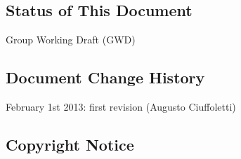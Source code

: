 \documentclass[12pt]{article}  %
\begin{document}
\newcommand{\mixin}[2]{
\begin{tabular}{ll}
\hline
Model attribute & value \\ \hline
scheme & http://ogf.schemas.sla/occi/monitoring\# \\
term & #1 \\
attributes & #2 \\ \hline
\end{tabular}
}

\newcommand{\extramixin}[2]{
\begin{tabular}{ll}
\hline
Model attribute & value \\ \hline
scheme & http://provider.com/monitoring\# \\
term & #1 \\
attributes & #2 \\ \hline
\end{tabular}
}

\begin{center}
\makeatletter
\Large\bf\textsf \@title
\makeatother
\end{center}



\subsection*{Status of This Document}

Group Working Draft (GWD)



\subsection*{Document Change History}

February 1st 2013: first revision (Augusto Ciuffoletti)

\subsection*{Copyright Notice}
\end{document}
